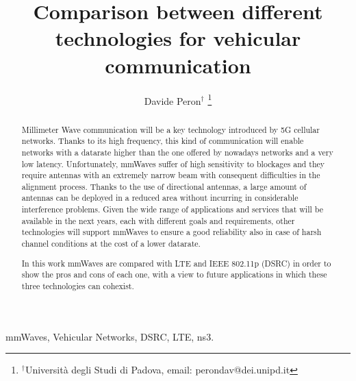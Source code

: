 \documentclass[10pt, conference, letterpaper]{IEEEtran}
\title{Comparison between different technologies for vehicular communication}
\author{Davide Peron$^\dag$
\thanks{$^\dag$Università degli Studi di Padova, email: perondav@dei.unipd.it}
}
\begin{document}
\maketitle

\begin{abstract}
Millimeter Wave communication will be a key technology introduced by 5G cellular networks. Thanks to its high frequency, this kind of communication will enable networks with a datarate higher than the one offered by nowadays networks and a very low latency. Unfortunately, mmWaves suffer of high sensitivity to blockages and they require antennas with an extremely narrow beam with consequent difficulties in the alignment process.
Thanks to the use of directional antennas, a large amount of antennas can be deployed in a reduced area without incurring in considerable interference problems.
Given the wide range of applications and services that will be available in the next years, each with different goals and requirements, other technologies will support mmWaves to ensure a good reliability also in case of harsh channel conditions at the cost of a lower datarate.

In this work mmWaves are compared with LTE and IEEE 802.11p (DSRC) in order to show the pros and cons of each one, with a view to future applications in which these three technologies can cohexist.
\end{abstract}

\IEEEkeywords
mmWaves, Vehicular Networks, DSRC, LTE, ns3.
\endIEEEkeywords














\end{document}
